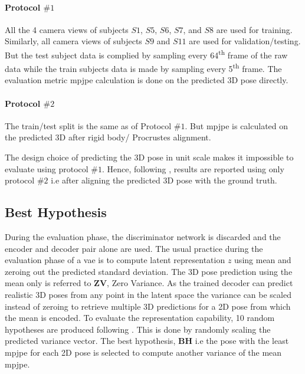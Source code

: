 \paragraph{Protocol $\#1$} All the 4 camera views of subjects $S1$, $S5$, $S6$, $S7$, and $S8$ are used for training. Similarly, all camera views of subjects $S9$ and $S11$ are used for validation/testing. But the test subject data is complied by sampling every 64\textsuperscript{th} frame of the raw data while the train subjects data is made by sampling every 5\textsuperscript{th} frame. 
The evaluation metric \ac{mpjpe} calculation is done on the predicted 3D pose directly.

\paragraph{Protocol $\#2$} The train/test split is the same as of Protocol $\#1$. But \ac{mpjpe} is calculated on the predicted 3D after rigid body/ Procrustes alignment.

The design choice of predicting the 3D pose in unit scale makes it impossible to evaluate using protocol $\#1$. Hence, following \cite{amazon1}, results are reported using only protocol $\#2$ i.e after aligning the predicted 3D pose with the ground truth.

\subsection{Best Hypothesis}
During the evaluation phase, the discriminator network is discarded and the encoder and decoder pair alone are used. The usual practice during the evaluation phase of a \ac{vae} is to compute latent representation $z$ using mean and zeroing out the predicted standard deviation. The 3D pose prediction using the mean only is referred to $\textbf{ZV}$, Zero Variance. As the trained decoder can predict realistic 3D poses from any point in the latent space the variance can be scaled instead of zeroing to retrieve multiple 3D predictions for a 2D pose from which the mean is encoded. To evaluate the representation capability, 10 random hypotheses are produced following \cite{weaklymultiple}. This is done by randomly scaling the predicted variance vector. The best hypothesis, \textbf{BH} i.e the pose with the least \ac{mpjpe} for each 2D pose is selected to compute another variance of the mean \ac{mpjpe}. %



